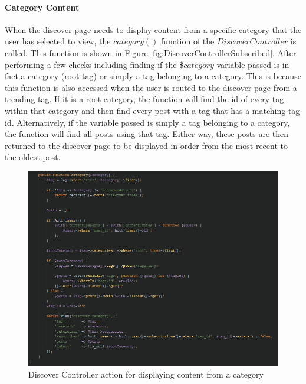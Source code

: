 \paragraph{Category Content}
When the discover page needs to display content from a specific category that the user has selected to view, the $category()$ function of the $Discover  Controller$ is called. This function is shown in Figure \ref{fig:DiscoverControllerSubscribed}. After performing a few checks including finding if the $\$category$ variable passed is in fact a category (root tag) or simply a tag belonging to a category. This is because this function is also accessed when the user is routed to the discover page from a trending tag. If it is a root category, the function will find the id of every tag within that category and then find every post with a tag that has a matching tag id. Alternatively, if the variable passed is simply a tag belonging to a category, the function will find all posts using that tag. Either way, these posts are then returned to the discover page to be displayed in order from the most recent to the oldest post.

\begin{figure}[H]
\centering
\includegraphics[width=\textwidth]{Images/Implementation/DiscoverControllerCategory}
\caption{Discover Controller action for displaying content from a category}
\label{fig:DiscoverControllerCategory}
\end{figure}

